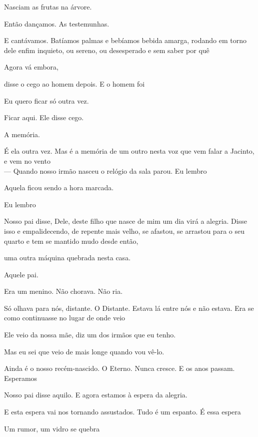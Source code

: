 Nasciam as frutas na árvore.

Então dançamos. As testemunhas.

E cantávamos. Batíamos palmas e bebíamos bebida amarga, rodando em torno
dele enfim inquieto, ou sereno, ou desesperado e sem saber por quê

\breakk

\vspace*{4cm}

Agora vá embora,

disse o cego ao homem depois. E o homem foi

Eu quero ficar só outra vez.

Ficar aqui. Ele disse cego.

\breakk

\vspace*{4cm}

A memória.

É ela outra vez. Mas é a memória de um outro nesta voz que vem falar a
Jacinto,\\

e vem no vento\\

--- Quando nosso irmão nasceu o relógio da sala parou. Eu lembro

Aquela ficou sendo a hora marcada.

Eu lembro

Nosso pai disse, Dele, deste filho que nasce de mim um dia virá a
alegria. Disse isso e empalidecendo, de repente mais velho, se afastou,
se arrastou para o seu quarto e tem se mantido mudo desde então,

uma outra máquina quebrada nesta casa.

Aquele pai.

Era um menino. Não chorava. Não ria.

Só olhava para nós, distante. O Distante. Estava lá entre nós e não
estava. Era se como continuasse no lugar de onde veio

Ele veio da nossa mãe, diz um dos irmãos que eu tenho.

Mas eu sei que veio de mais longe quando vou vê-lo.

Ainda é o nosso recém-nascido. O Eterno. Nunca cresce. E os anos passam.
Esperamos

Nosso pai disse aquilo. E agora estamos à espera da alegria.

E esta espera vai nos tornando assustados. Tudo é um espanto. É essa
espera

Um rumor, um vidro se quebra

